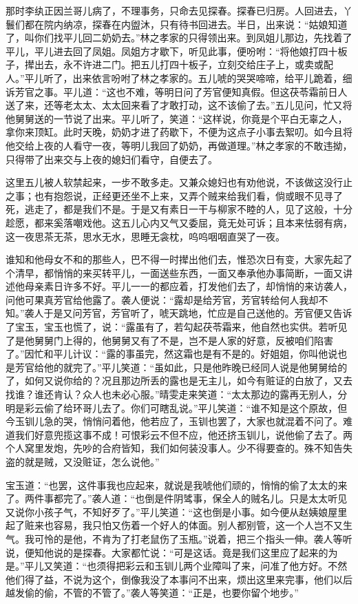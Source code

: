 那时李纨正因兰哥儿病了，不理事务，只命去见探春。探春已归房。人回进去，丫鬟们都在院内纳凉，探春在内盥沐，只有待书回进去。半日，出来说：“姑娘知道了，叫你们找平儿回二奶奶去。”林之孝家的只得领出来。到凤姐儿那边，先找着了平儿，平儿进去回了凤姐。凤姐方才歇下，听见此事，便吩咐：“将他娘打四十板子，撵出去，永不许进二门。把五儿打四十板子，立刻交给庄子上，或卖或配人。”平儿听了，出来依言吩咐了林之孝家的。五儿唬的哭哭啼啼，给平儿跪着，细诉芳官之事。平儿道：“这也不难，等明日问了芳官便知真假。但这茯苓霜前日人送了来，还等老太太、太太回来看了才敢打动，这不该偷了去。”五儿见问，忙又将他舅舅送的一节说了出来。平儿听了，笑道：“这样说，你竟是个平白无辜之人，拿你来顶缸。此时天晚，奶奶才进了药歇下，不便为这点子小事去絮叨。如今且将他交给上夜的人看守一夜，等明儿我回了奶奶，再做道理。”林之孝家的不敢违拗，只得带了出来交与上夜的媳妇们看守，自便去了。

这里五儿被人软禁起来，一步不敢多走。又兼众媳妇也有劝他说，不该做这没行止之事；也有抱怨说，正经更还坐不上来，又弄个贼来给我们看，倘或眼不见寻了死，逃走了，都是我们不是。于是又有素日一干与柳家不睦的人，见了这般，十分趁愿，都来奚落嘲戏他。这五儿心内又气又委屈，竟无处可诉；且本来怯弱有病，这一夜思茶无茶，思水无水，思睡无衾枕，呜呜咽咽直哭了一夜。

谁知和他母女不和的那些人，巴不得一时撵出他们去，惟恐次日有变，大家先起了个清早，都悄悄的来买转平儿，一面送些东西，一面又奉承他办事简断，一面又讲述他母亲素日许多不好。平儿一一的都应着，打发他们去了，却悄悄的来访袭人，问他可果真芳官给他露了。袭人便说：“露却是给芳官，芳官转给何人我却不知。”袭人于是又问芳官，芳官听了，唬天跳地，忙应是自己送他的。芳官便又告诉了宝玉，宝玉也慌了，说：“露虽有了，若勾起茯苓霜来，他自然也实供。若听见了是他舅舅门上得的，他舅舅又有了不是，岂不是人家的好意，反被咱们陷害了。”因忙和平儿计议：“露的事虽完，然这霜也是有不是的。好姐姐，你叫他说也是芳官给他的就完了。”平儿笑道：“虽如此，只是他昨晚已经同人说是他舅舅给的了，如何又说你给的？况且那边所丢的露也是无主儿，如今有赃证的白放了，又去找谁？谁还肯认？众人也未必心服。”晴雯走来笑道：“太太那边的露再无别人，分明是彩云偷了给环哥儿去了。你们可瞎乱说。”平儿笑道：“谁不知是这个原故，但今玉钏儿急的哭，悄悄问着他，他若应了，玉钏也罢了，大家也就混着不问了。难道我们好意兜揽这事不成！可恨彩云不但不应，他还挤玉钏儿，说他偷了去了。两个人窝里发炮，先吵的合府皆知，我们如何装没事人。少不得要查的。殊不知告失盗的就是贼，又没赃证，怎么说他。”

宝玉道：“也罢，这件事我也应起来，就说是我唬他们顽的，悄悄的偷了太太的来了。两件事都完了。”袭人道：“也倒是件阴骘事，保全人的贼名儿。只是太太听见又说你小孩子气，不知好歹了。”平儿笑道：“这也倒是小事。如今便从赵姨娘屋里起了赃来也容易，我只怕又伤着一个好人的体面。别人都别管，这一个人岂不又生气。我可怜的是他，不肯为了打老鼠伤了玉瓶。”说着，把三个指头一伸。袭人等听说，便知他说的是探春。大家都忙说：“可是这话。竟是我们这里应了起来的为是。”平儿又笑道：“也须得把彩云和玉钏儿两个业障叫了来，问准了他方好。不然他们得了益，不说为这个，倒像我没了本事问不出来，烦出这里来完事，他们以后越发偷的偷，不管的不管了。”袭人等笑道：“正是，也要你留个地步。”

